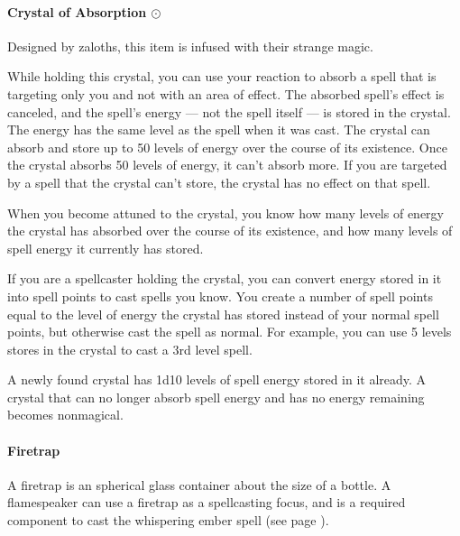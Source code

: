     \paragraph{Crystal of Absorption $\odot$}
        Designed by zaloths, this item is infused with their strange magic.

        While holding this crystal, you can use your reaction to absorb a spell that is targeting only you and not with an area of effect.
        The absorbed spell's effect is canceled, and the spell's energy --- not the spell itself --- is stored in the crystal.
        The energy has the same level as the spell when it was cast.
        The crystal can absorb and store up to 50 levels of energy over the course of its existence.
        Once the crystal absorbs 50 levels of energy, it can't absorb more.
        If you are targeted by a spell that the crystal can't store, the crystal has no effect on that spell.

        When you become attuned to the crystal, you know how many levels of energy the crystal has absorbed over the course of its existence, and how many levels of spell energy it currently has stored.

        If you are a spellcaster holding the crystal, you can convert energy stored in it into spell points to cast spells you know.
        You create a number of spell points equal to the level of energy the crystal has stored instead of your normal spell points, but otherwise cast the spell as normal.
        For example, you can use 5 levels stores in the crystal to cast a 3rd level spell.

        A newly found crystal has 1d10 levels of spell energy stored in it already.
        A crystal that can no longer absorb spell energy and has no energy remaining becomes nonmagical.
    \paragraph{Firetrap}
        A firetrap is an spherical glass container about the size of a bottle.
        A flamespeaker can use a firetrap as a spellcasting focus, and is a required component to cast the whispering ember spell (see page \pageref{spell::whisperingember}).
